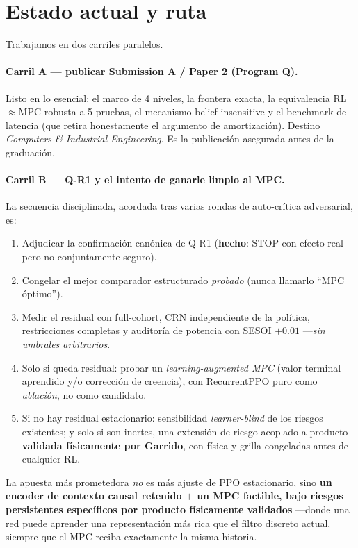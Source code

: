 \documentclass[11pt,a4paper]{article}
\begin{document}
\section{Estado actual y ruta}\label{sec:estado}
Trabajamos en dos carriles paralelos.

\paragraph{Carril A — publicar Submission A / Paper 2 (Program Q).} Listo en lo esencial: el marco de 4
niveles, la frontera exacta, la equivalencia RL${\approx}$MPC robusta a 5 pruebas, el mecanismo
belief-insensitive y el benchmark de latencia (que retira honestamente el argumento de amortización).
Destino \emph{Computers \& Industrial Engineering}. Es la publicación asegurada antes de la graduación.

\paragraph{Carril B — Q-R1 y el intento de ganarle limpio al MPC.} La secuencia disciplinada,
acordada tras varias rondas de auto-crítica adversarial, es:
\begin{enumerate}[nosep]
  \item Adjudicar la confirmación canónica de Q-R1 (\textbf{hecho}: STOP con efecto real pero no
        conjuntamente seguro).
  \item Congelar el mejor comparador estructurado \emph{probado} (nunca llamarlo ``MPC óptimo'').
  \item Medir el residual con full-cohort, CRN independiente de la política, restricciones completas y
        auditoría de potencia con SESOI $+0.01$ —\emph{sin umbrales arbitrarios}.
  \item Solo si queda residual: probar un \emph{learning-augmented MPC} (valor terminal aprendido y/o
        corrección de creencia), con RecurrentPPO puro como \emph{ablación}, no como candidato.
  \item Si no hay residual estacionario: sensibilidad \emph{learner-blind} de los riesgos existentes;
        y solo si son inertes, una extensión de riesgo acoplado a producto \textbf{validada
        físicamente por Garrido}, con física y grilla congeladas antes de cualquier RL.
\end{enumerate}
La apuesta más prometedora \emph{no} es más ajuste de PPO estacionario, sino \textbf{un encoder de
contexto causal retenido $+$ un MPC factible, bajo riesgos persistentes específicos por producto
físicamente validados} —donde una red puede aprender una representación más rica que el filtro discreto
actual, siempre que el MPC reciba exactamente la misma historia.
\end{document}
